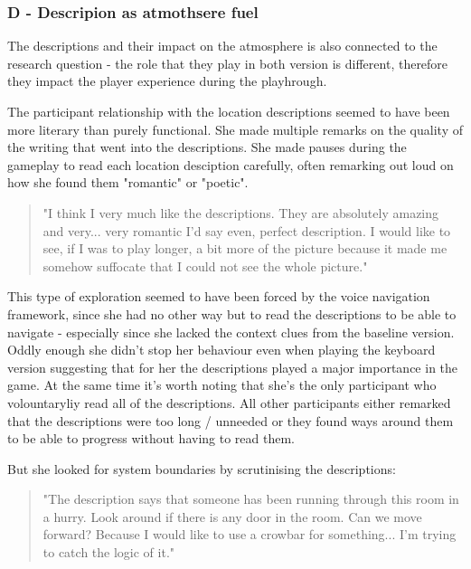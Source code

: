 \subsubsection{D - Descripion as atmothsere fuel}


The descriptions and their impact on the atmosphere is also connected to the research question - the role that they play in both version is different, therefore they impact the player experience during the playhrough.

The participant relationship with the location descriptions seemed to have been more literary than purely functional. She made multiple remarks on the quality of the writing that went into the descriptions. She made pauses during the gameplay to read each location desciption carefully, often remarking out loud on how she found them "romantic" or "poetic". 

\begin{quote}
    "I think I very much like the descriptions. They are absolutely amazing and very... very romantic I'd say even, perfect description. I would like to see, if I was to play longer, a bit more of the picture because it made me somehow suffocate that I could not see the whole picture."
\end{quote}

This type of exploration seemed to have been forced by the voice navigation framework, since she had no other way but to read the descriptions to be able to navigate - especially since she lacked the context clues from the baseline version. Oddly enough she didn't stop her behaviour even when playing the keyboard version suggesting that for her the descriptions played a major importance in the game. At the same time it's worth noting that she's the only participant who volountaryliy read all of the descriptions. All other participants either remarked that the descriptions were too long / unneeded or they found ways around them to be able to progress without having to read them.  

But she looked for system boundaries by scrutinising the descriptions:
\begin{quote}
    "The description says that someone has been running through this room in a hurry. Look around if there is any door in the room. Can we move forward? Because I would like to use a crowbar for something... I'm trying to catch the logic of it."
\end{quote}

